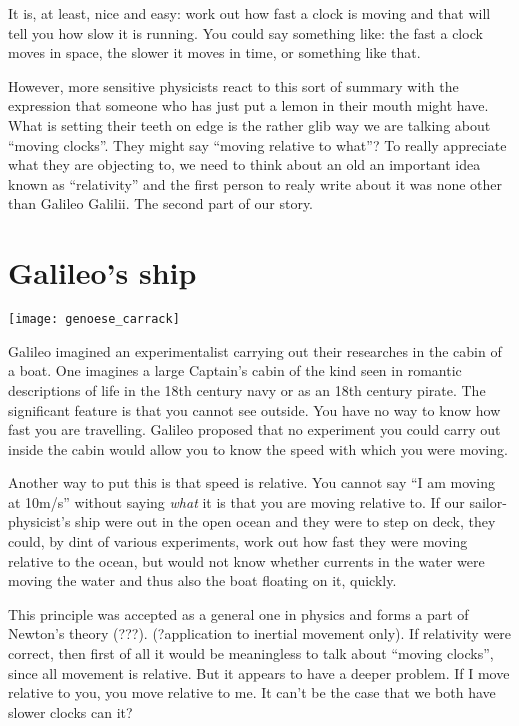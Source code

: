 \documentclass[a4paper]{report}
\begin{document}

It is, at least, nice and easy: work out how fast a clock is moving and that will tell you how slow it is running. You could say something like: the fast a clock moves in space, the slower it moves in time, or something like that.

However, more sensitive physicists react to this sort of summary with the expression that someone who has just put a lemon in their mouth might have. What is setting their teeth on edge is the rather glib way we are talking about ``moving clocks''. They might say ``moving relative to what''? To really appreciate what they are objecting to, we need to think about an old an important idea known as ``relativity'' and the first person to realy write about it was none other than Galileo Galilii. The second part of our story.

\section*{Galileo's ship}
\texttt{[image: genoese\_carrack]}

Galileo imagined an experimentalist carrying out their researches in the cabin of a boat. One imagines a large Captain's cabin of the kind seen in romantic descriptions of life in the 18th century navy or as an 18th century pirate. The significant feature is that you cannot see outside. You have no way to know how fast you are travelling. Galileo proposed that no experiment you could carry out inside the cabin would allow you to know the speed with which you were moving.

Another way to put this is that speed is relative. You cannot say ``I am moving at 10m/s'' without saying {\em what} it is that you are moving relative to. If our sailor-physicist's ship were out in the open ocean and they were to step on deck, they could, by dint of various experiments, work out how fast they were moving relative to the ocean, but would not know whether currents in the water were moving the water and thus also the boat floating on it, quickly.

This principle was accepted as a general one in physics and forms a part of Newton's theory (???). (?application to inertial movement only). If relativity were correct, then first of all it would be meaningless to talk about ``moving clocks'', since all movement is relative. But it appears to have a deeper problem. If I move relative to you, you move relative to me. It can't be the case that we both have slower clocks can it?
\end{document}

